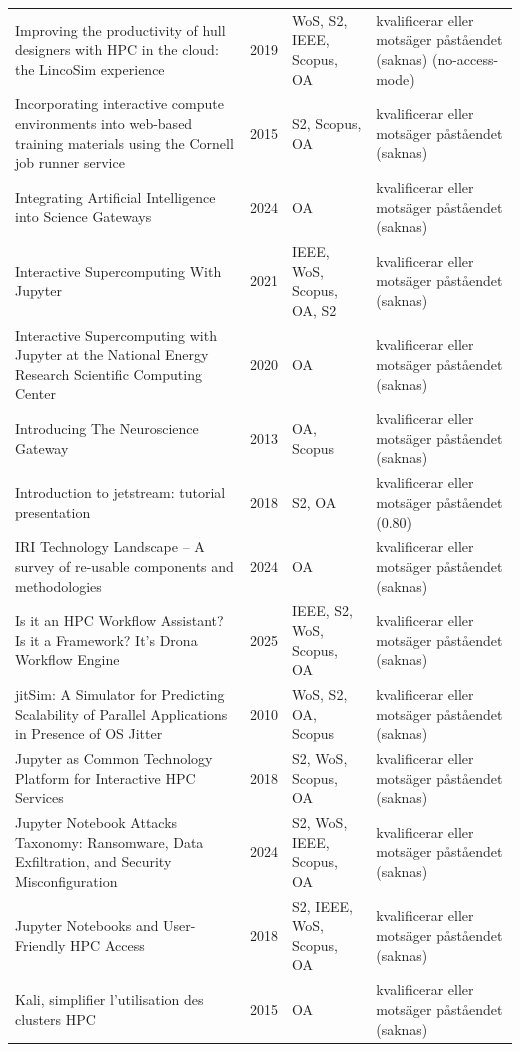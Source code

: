 \begin{longtable}{@{}%
  >{\raggedright\arraybackslash}p{}c%
  >{\raggedright\arraybackslash}p{}%
  >{\raggedright\arraybackslash}p{}@{}}
Improving the productivity of hull designers with HPC in the cloud: the LincoSim experience & 2019 & WoS, S2, IEEE, Scopus, OA & kvalificerar eller motsäger påståendet (saknas) (no-access-mode) \\
Incorporating interactive compute environments into web-based training materials using the Cornell job runner service & 2015 & S2, Scopus, OA & kvalificerar eller motsäger påståendet (saknas) \\
Integrating Artificial Intelligence into Science Gateways & 2024 & OA & kvalificerar eller motsäger påståendet (saknas) \\
Interactive Supercomputing With Jupyter & 2021 & IEEE, WoS, Scopus, OA, S2 & kvalificerar eller motsäger påståendet (saknas) \\
Interactive Supercomputing with Jupyter at the National Energy Research Scientific Computing Center & 2020 & OA & kvalificerar eller motsäger påståendet (saknas) \\
Introducing The Neuroscience Gateway & 2013 & OA, Scopus & kvalificerar eller motsäger påståendet (saknas) \\
Introduction to jetstream: tutorial presentation & 2018 & S2, OA & kvalificerar eller motsäger påståendet (0.80) \\
IRI Technology Landscape -- A survey of re-usable components and methodologies & 2024 & OA & kvalificerar eller motsäger påståendet (saknas) \\
Is it an HPC Workflow Assistant? Is it a Framework? It's Drona Workflow Engine & 2025 & IEEE, S2, WoS, Scopus, OA & kvalificerar eller motsäger påståendet (saknas) \\
jitSim: A Simulator for Predicting Scalability of Parallel Applications in Presence of OS Jitter & 2010 & WoS, S2, OA, Scopus & kvalificerar eller motsäger påståendet (saknas) \\
Jupyter as Common Technology Platform for Interactive HPC Services & 2018 & S2, WoS, Scopus, OA & kvalificerar eller motsäger påståendet (saknas) \\
Jupyter Notebook Attacks Taxonomy: Ransomware, Data Exfiltration, and Security Misconfiguration & 2024 & S2, WoS, IEEE, Scopus, OA & kvalificerar eller motsäger påståendet (saknas) \\
Jupyter Notebooks and User-Friendly HPC Access & 2018 & S2, IEEE, WoS, Scopus, OA & kvalificerar eller motsäger påståendet (saknas) \\
Kali, simplifier l'utilisation des clusters HPC & 2015 & OA & kvalificerar eller motsäger påståendet (saknas) \\

\end{longtable}
